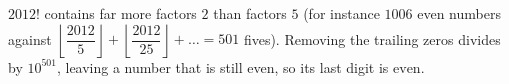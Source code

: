 $2012!$ contains far more factors $2$ than factors $5$ (for instance $1006$ even numbers against $\left\lfloor\dfrac{2012}5\right\rfloor+\left\lfloor\dfrac{2012}{25}\right\rfloor+\dots=501$ fives). Removing the trailing zeros divides by $10^{501}$, leaving a number that is still even, so its last digit is $\boxed{\text{even}}$.
